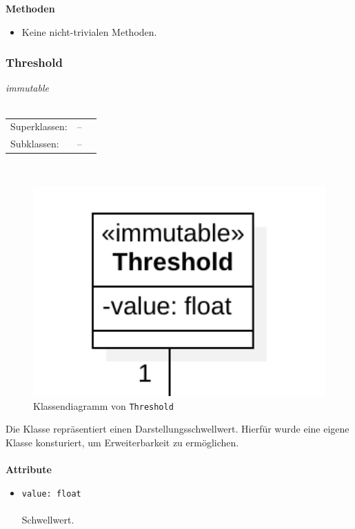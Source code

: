 \documentclass{article}
\begin{document}
\textbf{Methoden}
\begin{itemize}\setlength\itemsep{3em}
\item[] Keine nicht-trivialen Methoden.
\end{itemize}

\newpage
\subsubsection*{\large{\textbf{Threshold}\label{cls:Threshold}}}
\textit{\flqq{}immutable\frqq}\normalsize\\\\
\begin{tabular}{lll}
 Superklassen: & --\\
 Subklassen: & --
\end{tabular}\\
\begin{figure}[H]%
    \centering
    \includegraphics[width=13cm]{entwurf/Entwurf_dokument/img/cls/model/Threshold.png}
    \caption{Klassendiagramm von \texttt{Threshold}}
\end{figure}

Die Klasse repräsentiert einen Darstellungsschwellwert. Hierfür wurde eine eigene Klasse konsturiert, um Erweiterbarkeit zu ermöglichen.
\\\\

\textbf{Attribute}
\begin{itemize}\setlength\itemsep{3em}
\item \texttt{value: float}\\\\
Schwellwert.
\\\\
\end{itemize}
\end{document}
